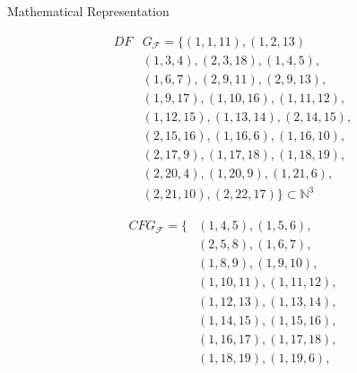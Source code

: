 \begin{blackbox}{Mathematical Representation}
    \centering
    \begin{minipage}{0.329\textwidth}
        \begin{graybox}
            \scriptsize
            \setlength{\abovedisplayskip}{0pt}
            \setlength{\belowdisplayskip}{0pt}
            \vspace{-0.5em}
            \begin{align*}
                DF&G_\mathcal F=\{(1,1,11),(1,2,13)\\[-0.5em]
                  &(1,3,4),(2,3,18),(1,4,5),\\[-0.5em]
                  &(1,6,7),(2,9,11),(2,9,13),\\[-0.5em]
                  &(1,9,17),(1,10,16),(1,11,12),\\[-0.5em]
                  &(1,12,15),(1,13,14),(2,14,15),\\[-0.5em]
                  &(2,15,16),(1,16,6),(1,16,10),\\[-0.5em]
                  &(2,17,9),(1,17,18),(1,18,19),\\[-0.5em]
                  &(2,20,4),(1,20,9),(1,21,6),\\[-0.5em]
                  &(2,21,10),(2,22,17)\}\subset\mathbb N^3
            \end{align*}
        \end{graybox}
    \end{minipage}
    \begin{minipage}{0.329\textwidth}
        \begin{graybox}
            \scriptsize
            \setlength{\abovedisplayskip}{0pt}
            \setlength{\belowdisplayskip}{0pt}
            \vspace{-0.5em}
            \begin{align*}
                CFG_\mathcal F=\{&(1,4,5),(1,5,6),\\[-0.5em]
                  &(2,5,8),(1,6,7),\\[-0.5em]
                  &(1,8,9),(1,9,10),\\[-0.5em]
                  &(1,10,11),(1,11,12),\\[-0.5em]
                  &(1,12,13),(1,13,14),\\[-0.5em]
                  &(1,14,15),(1,15,16),\\[-0.5em]
                  &(1,16,17),(1,17,18),\\[-0.5em]
                  &(1,18,19),(1,19,6),\\[-0.5em]

\end{align*}
\end{graybox}
\end{minipage}
\end{blackbox}
